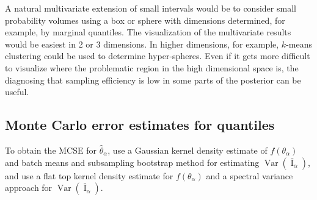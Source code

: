 \documentclass[american,]{article}
\DeclareMathOperator{\Var}{Var}
\DeclareMathOperator{\I}{I}
\theoremstyle{definition}
\begin{document}
A natural multivariate extension of small intervals would be to consider
small probability volumes using a box or sphere with dimensions
determined, for example, by marginal quantiles. The visualization of
the multivariate results would be easiest in 2 or 3 dimensions. In
higher dimensions, for example, $k$-means clustering could be used to
determine hyper-spheres. Even if it gets more difficult to visualize
where the problematic region in the high dimensional space
is, the diagnosing that sampling efficiency is low in some parts of the
posterior can be useful.

\hypertarget{mcse}{%
\subsection{Monte Carlo error estimates for quantiles}\label{mcse}}

To obtain the MCSE for
\(\hat{\theta}_\alpha\), \citet{Doss+etal:2014:MCMC-quantiles} use a
Gaussian kernel density estimate of \(f(\theta_\alpha)\) and
batch means and subsampling bootstrap method for estimating
\(\Var(\bar{\I}_\alpha)\), and \citet{Liu+etal:2016:MCMC-quantiles} use a
flat top kernel density estimate for \(f(\theta_\alpha)\) and a
spectral variance approach for \(\Var(\bar{\I}_\alpha)\).
\end{document}
